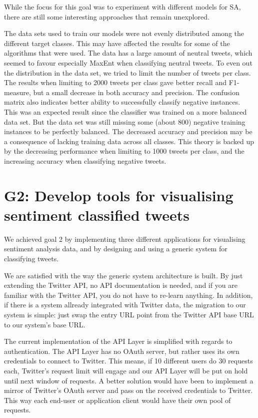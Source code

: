 While the focus for this goal was to experiment with different models for SA, there are still some interesting approaches that remain unexplored. 

The data sets used to train our models were not evenly distributed among the different target classes. This may have affected the results for some of the algorithms that were used. The data has a large amount of neutral tweets, which seemed to favour especially MaxEnt when classifying neutral tweets. To even out the distribution in the data set, we tried to limit the number of tweets per class. The results when limiting to 2000 tweets per class gave better recall and F1-measure, but a small decrease in both accuracy and precision. The confusion matrix also indicates better ability to successfully classify negative instances. This was an expected result since the classifier was trained on a more balanced data set. But the data set was still missing some (about 800) negative training instances to be perfectly balanced. The decreased accuracy and precision may be a consequence of lacking training data across all classes. This theory is backed up by the decreasing performance when limiting to 1000 tweets per class, and the increasing accuracy when classifying negative tweets. 


\section{G2: Develop tools for visualising sentiment classified tweets}

We achieved goal 2 by implementing three different applications for visualising sentiment analysis data, and by designing and using a generic system for classifying tweets. 

We are satisfied with the way the generic system architecture is built. By just extending the Twitter API, no API documentation is needed, and if you are familiar with the Twitter API, you do not have to re-learn anything. In addition, if there is a system allready integrated with Twitter data, the migration to our system is simple: just swap the entry URL point from the Twitter API base URL to our system's base URL. 

The current implementation of the API Layer is simplified with regards to authentication. The API Layer has no OAuth server, but rather uses its own credentials to connect to Twitter. This means, if 10 different users do 30 requests each, Twitter's request limit will engage and our API Layer will be put on hold until next window of requests. A better solution would have been to implement a mirror of Twitter's OAuth server and pass on the received credentials to Twitter. This way each end-user or application client would have their own pool of requests. 

